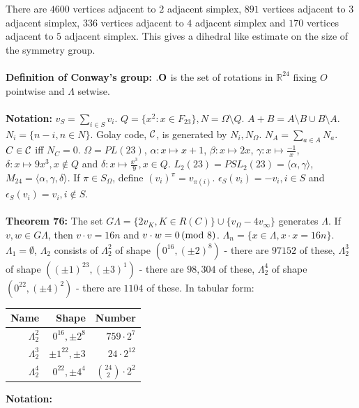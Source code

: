 There are 
$4600$ vertices adjacent to $2$ adjacent simplex,
$891$ vertices adjacent to $3$ adjacent simplex,
$336$ vertices adjacent to $4$ adjacent simplex and
$170$ vertices adjacent to $5$ adjacent simplex.  
This gives a dihedral like estimate on the size of the symmetry group.
\\
\\
{\bf Definition of
Conway's group:} ${\bf .O}$ is the set of rotations in ${\mathbb R}^{24}$ fixing $O$ 
pointwise and $\Lambda$ setwise.
\\
\\
{\bf Notation:}
$v_S= \sum_{i \in S} v_i$. 
$Q= \{ x^2: x \in F_{23} \}, N= \Omega \setminus Q$.
$A+B= A \setminus B \cup B \setminus A$.  $N_i= \{ n-i, n \in N \}$.  Golay code,
${\cal C}$, is
generated by $N_i, N_{\Omega}$.  $N_A = \sum_{a \in A} N_a$.  $C \in {\cal C}$ iff $N_C=0$.
$\Omega= PL(23)$, $\alpha: x \mapsto x+1$, $\beta: x \mapsto 2x$,
$\gamma: x \mapsto {\frac {-1} x}$, 
$\delta: x \mapsto 9 x^3, x \notin Q$ and
$\delta: x \mapsto {\frac {x^3} 9}, x \in Q$.  
$L_2(23)= PSL_2(23)= \langle \alpha, \gamma \rangle$,
$M_{24}= \langle \alpha, \gamma, \delta \rangle$.  If $\pi \in S_{\Omega}$, define
$(v_i)^{\pi} = v_{\pi(i)}$.  
$\epsilon_S(v_i) = -v_i, i \in S$ and
$\epsilon_S(v_i) = v_i, i \notin S$.
\\
\\
{\bf Theorem 76:}
The set $G \Lambda = \{ 2 v_K, K \in R(C) \} \cup
\{ v_{\Omega} - 4 v_{\infty} \}$ generates $\Lambda$.  If $v, w \in G \Lambda$, then
$v \cdot v= 16n$ and $v \cdot w = 0 \thinspace \textnormal{(mod } 8 \textnormal{)}$.  
$\Lambda_n= \{ x  \in \Lambda, x \cdot x = 16n \}$.  $\Lambda_1 = \emptyset$,
$\Lambda_2$ consists of 
$\Lambda_2^2$ of shape $(0^{16}, (\pm 2)^8)$ - there are $97152$ of these,
$\Lambda_2^3$ of shape $((\pm 1)^{23}, (\pm 3)^1)$ - there are $98,304$ of these,
$\Lambda_2^4$ of shape $(0^{22}, (\pm 4)^2)$ - there are $1104$ of these.
In tabular form:
\begin{center}
\begin{tabular} {|r|r|r|}
\hline
{\bf Name} & {\bf Shape} & {\bf Number} \\
\hline
$\Lambda_2^2$ & $0^{16}, \pm 2^8$ & $759 \cdot 2^7$\\
\hline
$\Lambda_2^3$ & $\pm 1^{22}, \pm 3$ & $24 \cdot 2^{12}$\\
\hline
$\Lambda_2^4$ & $0^{22}, \pm 4^4$ & ${24 \choose 2} \cdot 2^2$\\
\hline
\end{tabular}
\end{center}
{\bf Notation:}

